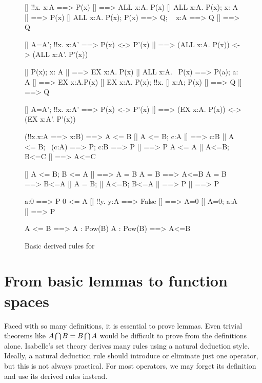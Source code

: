 \begin{figure}
\begin{ttbox}
       [| !!x. x:A ==> P(x) |] ==> ALL x:A. P(x)
       [| ALL x:A. P(x);  x: A |] ==> P(x)
       [| ALL x:A. P(x);  P(x) ==> Q;  ~ x:A ==> Q |] ==> Q

   [| A=A';  !!x. x:A' ==> P(x) <-> P'(x) |] ==> 
            (ALL x:A. P(x)) <-> (ALL x:A'. P'(x))

        [| P(x);  x: A |] ==> EX x:A. P(x)
       [| ALL x:A. ~P(x) ==> P(a);  a: A |] ==> EX x:A.P(x)
        [| EX x:A. P(x);  !!x. [| x:A; P(x) |] ==> Q |] ==> Q

    [| A=A';  !!x. x:A' ==> P(x) <-> P'(x) |] ==> 
            (EX x:A. P(x)) <-> (EX x:A'. P'(x))

       (!!x.x:A ==> x:B) ==> A <= B
       [| A <= B;  c:A |] ==> c:B
      [| A <= B;  ~(c:A) ==> P;  c:B ==> P |] ==> P
   A <= A
  [| A<=B;  B<=C |] ==> A<=C

     [| A <= B;  B <= A |] ==> A = B
    A = B ==> A<=B
    A = B ==> B<=A
     [| A = B;  [| A<=B; B<=A |] ==> P |]  ==>  P

          a:0 ==> P
   0 <= A
        [| !!y. y:A ==> False |] ==> A=0
        [| A=0;  a:A |] ==> P

            A <= B ==> A : Pow(B)
            A : Pow(B)  ==>  A<=B
\end{ttbox}
\caption{Basic derived rules for {\ZF}} \label{zf-lemmas1}
\end{figure}


\section{From basic lemmas to function spaces}
Faced with so many definitions, it is essential to prove lemmas.  Even
trivial theorems like $A\bigcap B=B\bigcap A$ would be difficult to prove
from the definitions alone.  Isabelle's set theory derives many rules using
a natural deduction style.  Ideally, a natural deduction rule should
introduce or eliminate just one operator, but this is not always practical.
For most operators, we may forget its definition and use its derived rules
instead.

